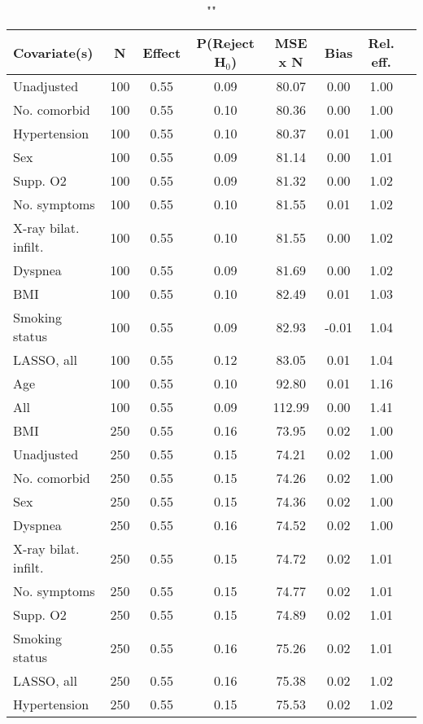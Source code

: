 \documentclass{article}
\begin{document}
{\tabcolsep=6pt  %
\begin{longtable}{lccccccc}
\caption{""} \\
Covariate(s) & N & Effect & P(Reject H$_0$) & MSE x N & Bias & Rel. eff.\\ \midrule
Unadjusted & 100 & 0.55 & 0.09 &  80.07 &  0.00 & 1.00 \\ 
No. comorbid & 100 & 0.55 & 0.10 &  80.36 &  0.00 & 1.00 \\ 
Hypertension & 100 & 0.55 & 0.10 &  80.37 &  0.01 & 1.00 \\ 
Sex & 100 & 0.55 & 0.09 &  81.14 &  0.00 & 1.01 \\ 
Supp. O2 & 100 & 0.55 & 0.09 &  81.32 &  0.00 & 1.02 \\ 
No. symptoms & 100 & 0.55 & 0.10 &  81.55 &  0.01 & 1.02 \\ 
X-ray bilat. infilt. & 100 & 0.55 & 0.10 &  81.55 &  0.00 & 1.02 \\ 
Dyspnea & 100 & 0.55 & 0.09 &  81.69 &  0.00 & 1.02 \\ 
BMI & 100 & 0.55 & 0.10 &  82.49 &  0.01 & 1.03 \\ 
Smoking status & 100 & 0.55 & 0.09 &  82.93 & -0.01 & 1.04 \\ 
LASSO, all & 100 & 0.55 & 0.12 &  83.05 &  0.01 & 1.04 \\ 
Age & 100 & 0.55 & 0.10 &  92.80 &  0.01 & 1.16 \\ 
All & 100 & 0.55 & 0.09 & 112.99 &  0.00 & 1.41 \\ \midrule 
BMI & 250 & 0.55 & 0.16 &  73.95 &  0.02 & 1.00 \\ 
Unadjusted & 250 & 0.55 & 0.15 &  74.21 &  0.02 & 1.00 \\ 
No. comorbid & 250 & 0.55 & 0.15 &  74.26 &  0.02 & 1.00 \\ 
Sex & 250 & 0.55 & 0.15 &  74.36 &  0.02 & 1.00 \\ 
Dyspnea & 250 & 0.55 & 0.16 &  74.52 &  0.02 & 1.00 \\ 
X-ray bilat. infilt. & 250 & 0.55 & 0.15 &  74.72 &  0.02 & 1.01 \\ 
No. symptoms & 250 & 0.55 & 0.15 &  74.77 &  0.02 & 1.01 \\ 
Supp. O2 & 250 & 0.55 & 0.15 &  74.89 &  0.02 & 1.01 \\ 
Smoking status & 250 & 0.55 & 0.16 &  75.26 &  0.02 & 1.01 \\ 
LASSO, all & 250 & 0.55 & 0.16 &  75.38 &  0.02 & 1.02 \\ 
Hypertension & 250 & 0.55 & 0.15 &  75.53 &  0.02 & 1.02 \\ 

\end{longtable}}
\end{document}
